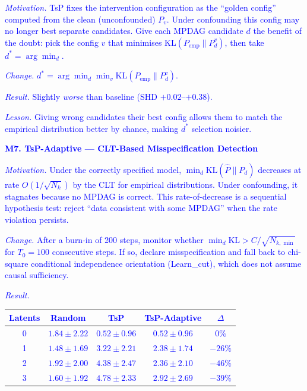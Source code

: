 \documentclass{article}
\begin{document}
\noindent\textcolor{blue}{\emph{Motivation.} TsP fixes the intervention configuration as the ``golden config'' computed from the clean (unconfounded) $P_v$. Under confounding this config may no longer best separate candidates. Give each MPDAG candidate $d$ the benefit of the doubt: pick the config $v$ that minimises $\text{KL}(P_\text{emp} \| P_d^v)$, then take $d^* = \arg\min_d$.}

\noindent\textcolor{blue}{\emph{Change.} $d^* = \arg\min_d \min_v \text{KL}(P_\text{emp} \| P_d^v)$.}

\noindent\textcolor{blue}{\emph{Result.} Slightly \emph{worse} than baseline (SHD $+0.02$--$+0.38$).}

\noindent\textcolor{blue}{\emph{Lesson.} Giving wrong candidates their best config allows them to match the empirical distribution better by chance, making $d^*$ selection noisier.}

\bigskip

\noindent\textcolor{blue}{\textbf{M7. TsP-Adaptive — CLT-Based Misspecification Detection \checkmark}}

\noindent\textcolor{blue}{\emph{Motivation.} Under the correctly specified model, $\min_d \text{KL}(\hat{P}\|P_d)$ decreases at rate $O(1/\sqrt{N_k})$ by the CLT for empirical distributions. Under confounding, it stagnates because no MPDAG is correct. This rate-of-decrease is a sequential hypothesis test: reject ``data consistent with some MPDAG'' when the rate violation persists.}

\noindent\textcolor{blue}{\emph{Change.} After a burn-in of 200 steps, monitor whether $\min_d \text{KL} > C/\sqrt{N_{k,\min}}$ for $T_0 = 100$ consecutive steps. If so, declare misspecification and fall back to chi-square conditional independence orientation (Learn\_cut), which does not assume causal sufficiency.}

\noindent\textcolor{blue}{\emph{Result.}
\begin{center}
\begin{tabular}{c|cccc}
\toprule
Latents & Random & TsP & TsP-Adaptive & $\Delta$ \\
\midrule
0 & $1.84\pm2.22$ & $0.52\pm0.96$ & $0.52\pm0.96$ & $0\%$ \\
1 & $1.48\pm1.69$ & $3.22\pm2.21$ & $\mathbf{2.38\pm1.74}$ & $-26\%$ \\
2 & $1.92\pm2.00$ & $4.38\pm2.47$ & $\mathbf{2.36\pm2.10}$ & $-46\%$ \\
3 & $1.60\pm1.92$ & $4.78\pm2.33$ & $\mathbf{2.92\pm2.69}$ & $-39\%$ \\
\bottomrule
\end{tabular}
\end{center}}
\end{document}
